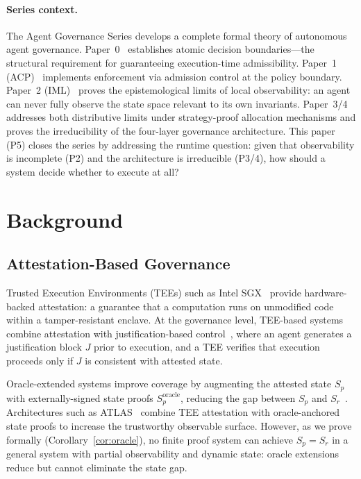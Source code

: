 \documentclass[11pt]{article}
\newcommand{\Sr}{S_r}
\newcommand{\Sp}{S_p}
\begin{document}
\paragraph{Series context.}
The Agent Governance Series develops a complete formal theory of autonomous
agent governance.
Paper~0~\cite{fernandez2026a} establishes atomic decision boundaries---the
structural requirement for guaranteeing execution-time admissibility.
Paper~1 (ACP)~\cite{fernandez2026b} implements enforcement via admission control
at the policy boundary.
Paper~2 (IML)~\cite{fernandez2026c} proves the epistemological limits of local
observability: an agent can never fully observe the state space relevant to its
own invariants.
Paper~3/4~\cite{fernandez2026govstr} addresses both distributive limits
under strategy-proof allocation mechanisms and proves the irreducibility of the
four-layer governance architecture.
This paper (P5) closes the series by addressing the runtime question: given
that observability is incomplete (P2) and the architecture is irreducible (P3/4),
how should a system decide whether to execute at all?

\section{Background}
\label{sec:background}

\subsection{Attestation-Based Governance}

Trusted Execution Environments (TEEs) such as Intel SGX~\cite{costan2016intel}
provide hardware-backed attestation: a guarantee that a computation runs on
unmodified code within a tamper-resistant enclave.
At the governance level, TEE-based systems combine attestation with
justification-based control~\cite{gu2017certikos}, where an agent generates a
justification block $J$ prior to execution, and a TEE verifies that execution
proceeds only if $J$ is consistent with attested state.

Oracle-extended systems improve coverage by augmenting the attested state $\Sp$
with externally-signed state proofs $\Sp^{\text{oracle}}$, reducing the gap
between $\Sp$ and $\Sr$~\cite{adler2018astraea}.
Architectures such as ATLAS~\cite{zhang2020deco} combine TEE attestation with
oracle-anchored state proofs to increase the trustworthy observable surface.
However, as we prove formally (Corollary~\ref{cor:oracle}), no finite proof
system can achieve $\Sp = \Sr$ in a general system with partial observability
and dynamic state: oracle extensions reduce but cannot eliminate the state gap.
\end{document}
